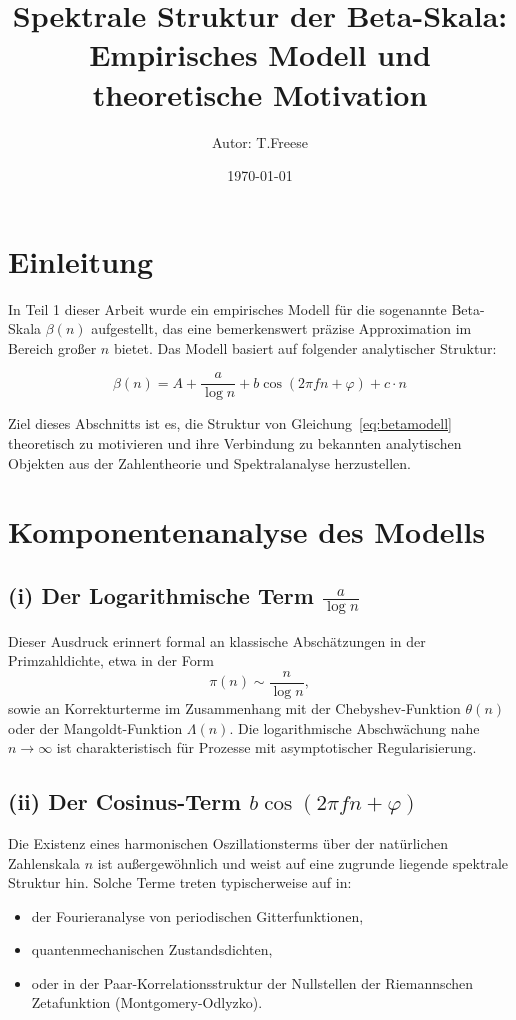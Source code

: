 \documentclass[a4paper,12pt]{article}
\title{Spektrale Struktur der Beta-Skala: \\ Empirisches Modell und theoretische Motivation}
\author{Autor: T.Freese}
\date{\today}
\begin{document}
\maketitle

\section{Einleitung}

In Teil 1 dieser Arbeit wurde ein empirisches Modell für die sogenannte Beta-Skala $\beta(n)$ aufgestellt, das eine bemerkenswert präzise Approximation im Bereich großer $n$ bietet. Das Modell basiert auf folgender analytischer Struktur:

\begin{equation}
\boxed{
\beta(n) = A + \frac{a}{\log n} + b \cos(2\pi f n + \varphi) + c \cdot n
}
\label{eq:betamodell}
\end{equation}

Ziel dieses Abschnitts ist es, die Struktur von Gleichung~\eqref{eq:betamodell} theoretisch zu motivieren und ihre Verbindung zu bekannten analytischen Objekten aus der Zahlentheorie und Spektralanalyse herzustellen.

\section{Komponentenanalyse des Modells}

\subsection*{(i) Der Logarithmische Term \boldmath$\frac{a}{\log n}$}

Dieser Ausdruck erinnert formal an klassische Abschätzungen in der Primzahldichte, etwa in der Form
\[
\pi(n) \sim \frac{n}{\log n},
\]
sowie an Korrekturterme im Zusammenhang mit der Chebyshev-Funktion $\theta(n)$ oder der Mangoldt-Funktion $\Lambda(n)$. Die logarithmische Abschwächung nahe $n \to \infty$ ist charakteristisch für Prozesse mit asymptotischer Regularisierung.

\subsection*{(ii) Der Cosinus-Term \boldmath$b \cos(2\pi f n + \varphi)$}

Die Existenz eines harmonischen Oszillationsterms über der natürlichen Zahlenskala $n$ ist außergewöhnlich und weist auf eine zugrunde liegende spektrale Struktur hin. Solche Terme treten typischerweise auf in:
\begin{itemize}
  \item der Fourieranalyse von periodischen Gitterfunktionen,
  \item quantenmechanischen Zustandsdichten,
  \item oder in der Paar-Korrelationsstruktur der Nullstellen der Riemannschen Zetafunktion (Montgomery-Odlyzko).
\end{itemize}
\end{document}
